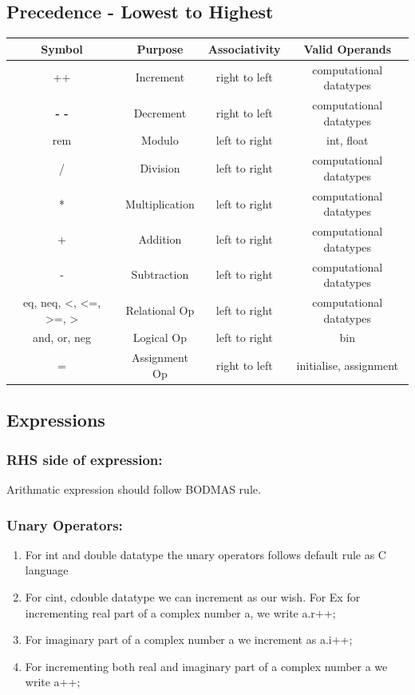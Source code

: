 \documentclass[12pt]{article}
\begin{document}
\subsection{Precedence - Lowest to Highest}
\begin{table}[ht]
\centering
\renewcommand{\arraystretch}{1.5} %
\setlength{\tabcolsep}{15pt} %
\begin{tabular}{|c|c|c|c|}
\hline
\textbf{Symbol} & \textbf{Purpose} & \textbf{Associativity} & \textbf{Valid Operands} \\
\hline
++ & Increment & right to left & computational datatypes \\
\hline
\textbf{- -} & Decrement & right to left & computational datatypes \\
\hline
rem & Modulo & left to right & int, float  \\
\hline
/ & Division  & left to right & computational datatypes \\
\hline
* &  Multiplication & left to right & computational datatypes \\
\hline
+ &  Addition & left to right & computational datatypes  \\
\hline
- &  Subtraction & left to right & computational datatypes \\
\hline
eq, neq, <, <=, >=, > & Relational Op & left to right & computational datatypes \\
\hline
and, or, neg & Logical Op & left to right & bin \\
\hline
= & Assignment Op & right to left & initialise, assignment \\
\hline
\end{tabular}
\end{table}

\subsection{Expressions}
    \subsubsection{ RHS side of expression:}
    Arithmatic expression should follow BODMAS rule.
    \subsubsection{ Unary Operators:}
    \begin{enumerate}
        \item For int and double datatype the unary operators follows default rule as C language
        \item For cint, cdouble datatype we can increment as our wish. For Ex for incrementing real part of a complex number a, we write a.r++; 
        \item For imaginary part of a complex number a we increment as a.i++;
        \item For incrementing both real and imaginary part of a complex number a we write a++;
    \end{enumerate}
\end{document}
